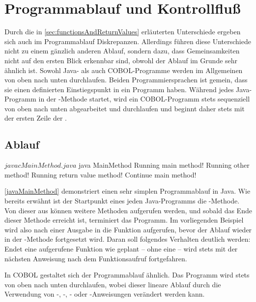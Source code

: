 \section{Programmablauf und Kontrollfluß}\label{programmablauf}
Durch die in \autoref{sec:functionsAndReturnValues} erläuterten Unterschiede ergeben sich auch im Programmablauf Diskrepanzen. Allerdings führen diese Unterschiede nicht zu einem gänzlich anderen Ablauf, sondern dazu, dass Gemeinsamkeiten nicht auf den ersten Blick erkennbar sind, obwohl der Ablauf im Grunde sehr ähnlich ist. Sowohl Java- als auch COBOL-Programme werden im Allgemeinen von oben nach unten durchlaufen. Beiden Programmiersprachen ist gemein, dass sie einen definierten Einstiegspunkt in ein Programm haben. Während jedes Java-Programm in der -Methode startet, wird ein COBOL-Programm stets sequenziell von oben nach unten abgearbeitet und durchlaufen und beginnt daher stets mit der ersten Zeile der .

\subsection{Ablauf}
\sepCodeAndOutputCheck
\begin{shellwindow}
$ javac MainMethod.java 
$ java MainMethod
Running main method!
Running other method!
Running return value method!
Continue main method!
\end{shellwindow}

\autoref{javaMainMethod} demonstriert einen sehr simplen Programmablauf in Java. Wie bereits erwähnt ist der Startpunkt eines jeden Java-Programms die -Methode. Von dieser aus können weitere Methoden aufgerufen werden, und sobald das Ende dieser Methode erreicht ist, terminiert das Programm. Im vorliegenden Beispiel wird also nach einer Ausgabe in  die Funktion  aufgerufen, bevor der Ablauf wieder in der -Methode fortgesetzt wird. Daran soll folgendes Verhalten deutlich werden: Endet eine aufgerufene Funktion wie geplant -- \dh ohne eine  -- wird stets mit der nächsten Anweisung nach dem Funktionsaufruf fortgefahren. 

In COBOL gestaltet sich der Programmablauf ähnlich. Das Programm wird stets von oben nach unten durchlaufen, wobei dieser lineare Ablauf \zB durch die Verwendung von -, -, - oder -Anweisungen verändert werden kann.

